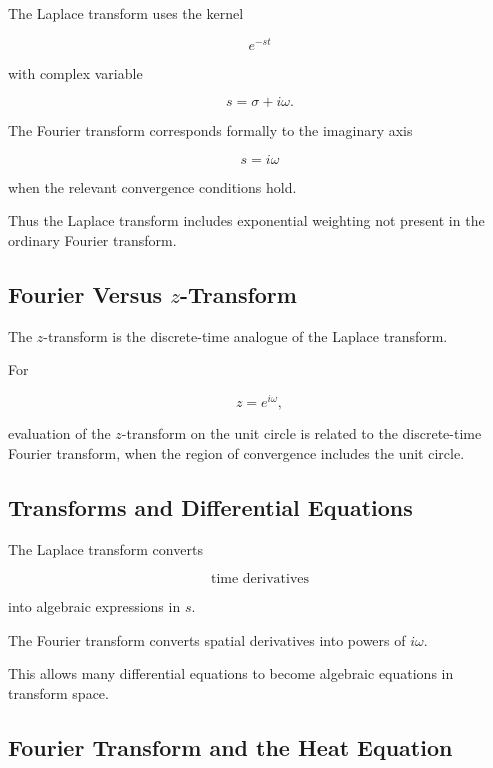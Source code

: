 The Laplace transform uses the kernel

\[
\boxed{
e^{-st}
}
\]

with complex variable

\[
s=\sigma+i\omega.
\]

The Fourier transform corresponds formally to the imaginary axis

\[
\boxed{
s=i\omega
}
\]

when the relevant convergence conditions hold.

Thus the Laplace transform includes exponential weighting not present in the
ordinary Fourier transform.

\subsection{Fourier Versus \(z\)-Transform}
\label{subsec:fourier-versus-z-transform}

The \(z\)-transform is the discrete-time analogue of the Laplace transform.

For

\[
z=e^{i\omega},
\]

evaluation of the \(z\)-transform on the unit circle is related to the
discrete-time Fourier transform, when the region of convergence includes the
unit circle.

\subsection{Transforms and Differential Equations}
\label{subsec:transforms-differential-equations}

The Laplace transform converts

\[
\boxed{
\text{time derivatives}
}
\]

into algebraic expressions in \(s\).

The Fourier transform converts spatial derivatives into powers of
\(i\omega\).

This allows many differential equations to become algebraic equations in
transform space.

\subsection{Fourier Transform and the Heat Equation}
\label{subsec:fourier-heat-equation-reference}

